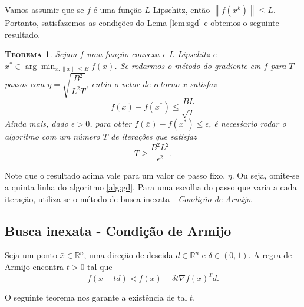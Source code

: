 \documentclass[
	12pt,				%
    oneside,			%
	a4paper,			%
	english,			%
	french,				%
	spanish,			%
	brazil,				%
	]{abntex2}
\newtheorem{theorem}{\scshape Teorema}[section]
\newcommand{\norm}[1]{\left\lVert#1\right\rVert}
\begin{document}
        Vamos assumir que se $f$ é uma função $L$-Lipschitz, então $\norm{f(x^k)} \leq L$. Portanto, satisfazemos as condições do Lema \ref{lem:sgd} e obtemos o seguinte resultado.


        \begin{theorem}
            Sejam $f$ uma função convexa e $L$-Lipschitz e $x^{*} \in \arg\min_{x:\norm{x} \leq B} f(x)$. Se rodarmos o método do gradiente em $f$ para $T$ passos com $\eta = \sqrt{\dfrac{B^2}{L^2T}}$, então o vetor de retorno $\bar{x}$ satisfaz
            \begin{equation*}
                f(\bar{x}) - f(x^{*}) \leq \frac{BL}{\sqrt{T}}
            \end{equation*}
            Ainda mais, dado $\epsilon > 0$, para obter $f(\bar{x}) - f(x^{*}) \leq \epsilon$, é necesśario rodar o algoritmo com um número $T$ de iterações que satisfaz
            \begin{equation*}
                T \geq \frac{B^2L^2}{\epsilon^2}.
            \end{equation*}
        \end{theorem}

        Note que o resultado acima vale para um valor de passo fixo, $\eta$. Ou seja, omite-se a quinta linha do algoritmo \ref{alg:gd}. Para uma escolha do passo que varia a cada iteração, utiliza-se o método de busca inexata - \emph{Condição de Armijo}.

        \subsection{Busca inexata - Condição de Armijo}
            Seja um ponto $\bar{x} \in \mathbb{R}^n$, uma direção de descida $d\in\mathbb{R}^n$ e $\delta \in (0,1)$. A regra de Armijo encontra $t>0$ tal que
            \begin{equation*}
                f(\bar{x} +td) < f(\bar{x}) + \delta t \nabla f(\bar{x})^Td.
            \end{equation*}

            O seguinte teorema nos garante a existência de tal $t$.
\end{document}
